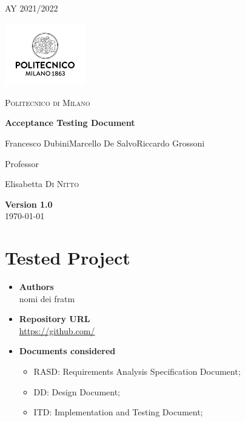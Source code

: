 \documentclass[table, 12pt]{article}
\begin{document}
\begin{titlepage}
    \centering
    {\scshape\large AY 2021/2022 \par}
    \vfill
    \includegraphics[width=100pt]{assets/logo_polimi}\par\vspace{1cm}
    {\scshape\LARGE Politecnico di Milano \par}
    \vspace{1.5cm}
    {\huge\bfseries Acceptance Testing Document \par}
    \vspace{2cm}
    {\Large {Francesco Dubini\quad Marcello De Salvo\quad Riccardo Grossoni}\par}
    \vfill
    {\large Professor\par
        Elisabetta \textsc{Di Nitto}}
    \vfill
    {\large \textbf{Version 1.0} \\ \today \par}
\end{titlepage}
\thispagestyle{plain}
\mbox{}
\newpage
{}
\tableofcontents
\newpage
{}

\section{Tested Project}
\begin{itemize}
    \item \textbf{Authors}
    \\nomi dei fratm
    \item \textbf{Repository URL}\\ \underline{\url{https://github.com/}}
    \item \textbf{Documents considered}\begin{itemize}
              \item RASD: Requirements Analysis Specification Document;
              \item DD: Design Document;
              \item ITD: Implementation and Testing Document;
          \end{itemize}
\end{itemize}
\newpage
\end{document}
